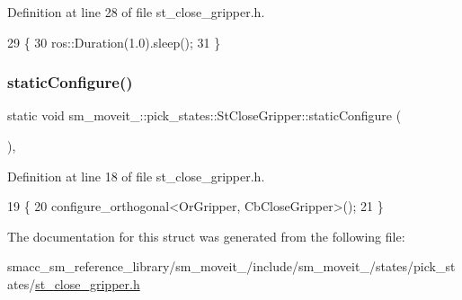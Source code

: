 Definition at line 28 of file st\+\_\+close\+\_\+gripper.\+h.


\begin{DoxyCode}
29    \{
30       ros::Duration(1.0).sleep();
31    \}
\end{DoxyCode}
\mbox{\label{structsm__moveit__4_1_1pick__states_1_1StCloseGripper_a5076328fb91d79beac4b1910aee86b05}} 
\subsubsection{\texorpdfstring{static\+Configure()}{staticConfigure()}}
{\footnotesize\ttfamily static void sm\+\_\+moveit\+\_\+::pick\+\_\+states\+::\+St\+Close\+Gripper\+::static\+Configure (\begin{DoxyParamCaption}{ }\end{DoxyParamCaption})\hspace{0.3cm}{\ttfamily [inline]}, {\ttfamily [static]}}



Definition at line 18 of file st\+\_\+close\+\_\+gripper.\+h.


\begin{DoxyCode}
19    \{
20       configure\_orthogonal<OrGripper, CbCloseGripper>();
21    \}
\end{DoxyCode}


The documentation for this struct was generated from the following file\+:\begin{DoxyCompactItemize}
\item 
smacc\+\_\+sm\+\_\+reference\+\_\+library/sm\+\_\+moveit\+\_/include/sm\+\_\+moveit\+\_/states/pick\+\_\+states/\hyperlink{4_2include_2sm__moveit__4_2states_2pick__states_2st__close__gripper_8h}{st\+\_\+close\+\_\+gripper.\+h}\end{DoxyCompactItemize}
